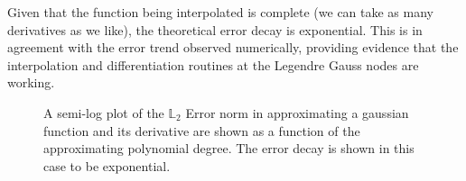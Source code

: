\documentclass[12pt]{softwaremanual}
\begin{document}
Given that the function being interpolated is complete (we can take as many derivatives as we like), the theoretical error decay is exponential. This is in agreement with the error trend observed numerically, providing evidence that the interpolation and differentiation routines at the Legendre Gauss nodes are working.

\begin{figure}[t!]
\begin{center}

   \caption{ A semi-log plot of the $\mathbb{L}_2$ Error norm in approximating a gaussian function and its derivative are shown as a function of the approximating polynomial degree. The error decay is shown in this case to be exponential. }\label{fig:Errors}
\end{center}
\end{figure}  


\pagebreak


\end{document}
